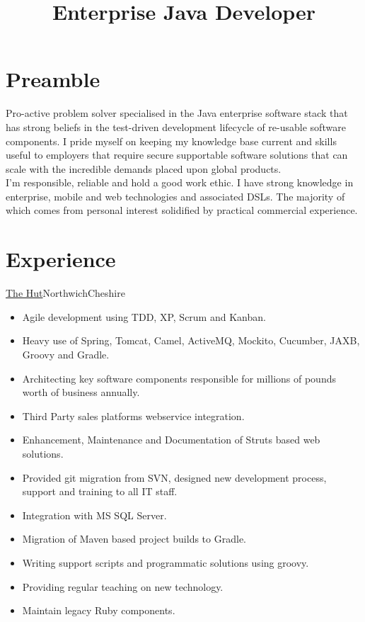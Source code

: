 \documentclass[a4paper,10pt]{moderncv}
\title{Enterprise Java Developer}
\newcommand\weblink[2] {{\color{href} \href{#1}{#2}}}
\begin{document}
\maketitle

\section{Preamble}
Pro-active problem solver specialised in the Java enterprise software stack that has strong beliefs in the test-driven development lifecycle of re-usable software components.
I pride myself on keeping my knowledge base current and skills useful to employers that require secure supportable software solutions that can scale with the incredible demands placed upon global products.\\

I'm responsible, reliable and hold a good work ethic.
I have strong knowledge in enterprise, mobile and web technologies and associated DSLs. The majority of which comes from personal interest solidified by practical commercial experience.

\section{Experience}

{\weblink{http://www.thehutgroup.com}{The Hut}}{Northwich}{Cheshire}{
\begin{itemize}
  \item Agile development using TDD, XP, Scrum and Kanban.
  \item Heavy use of Spring, Tomcat, Camel, ActiveMQ, Mockito, Cucumber, JAXB, Groovy and Gradle.
  \item Architecting key software components responsible for millions of pounds worth of business annually.
  \item Third Party sales platforms webservice integration.
  \item Enhancement, Maintenance and Documentation of Struts based web solutions.
  \item Provided git migration from SVN, designed new development process, support and training to all IT staff.
  \item Integration with MS SQL Server.
  \item Migration of Maven based project builds to Gradle.
  \item Writing support scripts and programmatic solutions using groovy.
  \item Providing regular teaching on new technology.
  \item Maintain legacy Ruby components.
\end{itemize}
}
\end{document}

